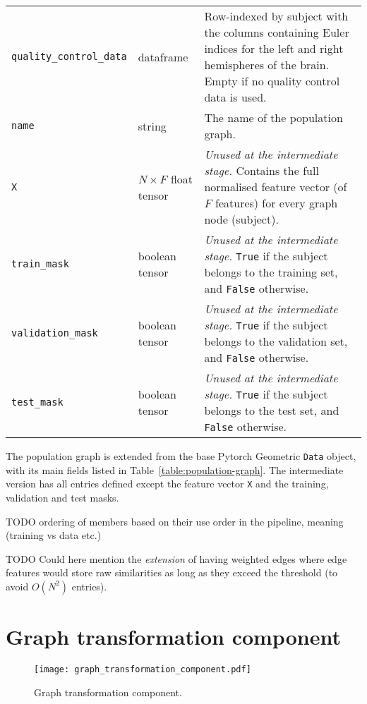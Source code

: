 \begin{table}[]
\begin{tabular}{lp{}p{}}
    \texttt{quality\_control\_data} & dataframe & Row-indexed by subject with the columns containing Euler indices for the left and right hemispheres of the brain. Empty if no quality control data is used. \\
    \texttt{name} & string & The name of the population graph. \\
    \texttt{X} & $N \times F$ \hfill\newline float tensor & \textit{Unused at the intermediate stage.} Contains the full normalised feature vector (of $F$ features) for every graph node (subject). \\
    \texttt{train\_mask} & boolean tensor & \textit{Unused at the intermediate stage.} \texttt{True} if the subject belongs to the training set, and \texttt{False} otherwise. \\
    \texttt{validation\_mask} & boolean tensor & \textit{Unused at the intermediate stage.} \texttt{True} if the subject belongs to the validation set, and \texttt{False} otherwise. \\
    \texttt{test\_mask} & boolean tensor & \textit{Unused at the intermediate stage.} \texttt{True} if the subject belongs to the test set, and \texttt{False} otherwise.
    \end{tabular}
\end{table}

The population graph is extended from the base Pytorch Geometric \texttt{Data} object, with its main fields listed in Table~\ref{table:population-graph}. The intermediate version has all entries defined except the feature vector \texttt{X} and the training, validation and test masks.

TODO ordering of members based on their use order in the pipeline, meaning (training vs data etc.)

TODO Could here mention the \textit{extension} of having weighted edges where edge features would store raw similarities as long as they exceed the threshold (to avoid $O(N^2)$ entries).


\section{Graph transformation component}

\begin{figure}[h]
    \centering
    \texttt{[image: graph\_transformation\_component.pdf]}
    \caption{Graph transformation component.}\label{graph-transformation-component}
\end{figure}

